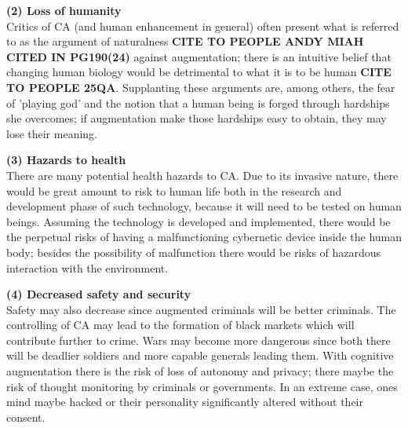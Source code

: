 \textbf{(2) Loss of humanity} \\
Critics of CA (and human enhancement in general) often present what is referred to as the argument of naturalness {\bf CITE TO PEOPLE ANDY MIAH CITED IN PG190(24)} against augmentation; there is an intuitive belief that changing human biology would be detrimental to what it is to be human {\bf CITE TO PEOPLE 25QA}. Supplanting these arguments are, among others, the fear of 'playing god' and the notion that a human being is forged through hardships she overcomes; if augmentation make those hardships easy to obtain, they may lose their meaning.


\textbf{(3) Hazards to health} \\
There are many potential health hazards to CA. Due to its invasive nature, there would be great amount to risk to human life both in the research and development phase of such technology, because it will need to be tested on human beings. Assuming the technology is developed and implemented, there would be the perpetual risks of having a malfunctioning cybernetic device inside the human body; besides the possibility of malfunction there would be risks of hazardous interaction with the environment.


\textbf{(4) Decreased safety and security} \\
Safety may also decrease since augmented criminals will be better criminals. The controlling of CA may lead to the formation of black markets which will contribute further to crime. Wars may become more dangerous since both there will be deadlier soldiers and more capable generals leading them. With cognitive augmentation there is the risk of loss of autonomy and privacy; there maybe the risk of thought monitoring by criminals or governments. In an extreme case, ones mind maybe hacked or their personality significantly altered without their consent.


